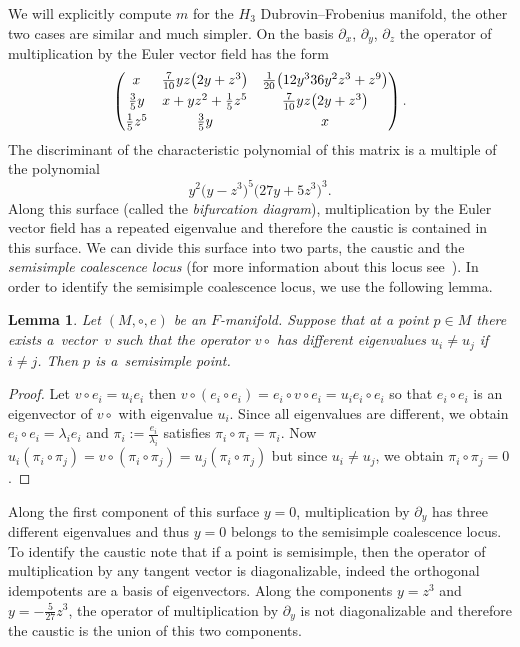 \documentclass[10pt,a4paper]{amsart}
\numberwithin{equation}{section}
\newtheorem{Lemma}[Theorem]{Lemma}
\begin{document}
We will explicitly compute $m$ for the $H_{3}$ Dubrovin--Frobenius manifold, the other two cases are similar and much simpler. On the basis $\partial_{x}$, $\partial_{y}$, $\partial_{z}$ the operator of multiplication by the Euler vector field has the form
\begin{equation*}
 \begin{pmatrix}
 x & \frac{7}{10}yz\bigl(2y +z^{3}\bigr) & \frac{1}{20}\bigl(12y^{3}36y^{2}z^{3}+z^{9}\bigr)\vspace{1mm}\\
 \frac{3}{5}y&x+yz^{2}+\frac{1}{5}z^{5}&\frac{7}{10}yz\bigl(2y+z^{3}\bigr)\vspace{1mm} \\
 \frac{1}{5}z^{5}&\frac{3}{5}y&x
 \end{pmatrix}.
\end{equation*}
The discriminant of the characteristic polynomial of this matrix is a multiple of the polynomial
\begin{equation*}
 y^{2}\bigl(y-z^{3}\bigr)^{5}\bigl(27y+5z^{3}\bigr)^{3}.
\end{equation*}
Along this surface (called the \emph{bifurcation diagram}), multiplication by the Euler vector field has a repeated eigenvalue and therefore the caustic is contained in this surface. We can divide this surface into two parts, the caustic and the \emph{semisimple coalescence locus} (for more information about this locus see~\cite{MR4094756}). In order to identify the semisimple coalescence locus, we use the following lemma.
\begin{Lemma}
 Let $(M,\circ,e)$ be an $F$-manifold. Suppose that at a point $p\in M$ there exists a~vector~$v$ such that the operator $v\circ$ has different eigenvalues $u_{i}\neq u_{j}$ if $i\neq j$. Then $p$ is a~semisimple point.
\end{Lemma}
\begin{proof}
 Let $v\circ e_{i}=u_{i}e_{i}$ then $v\circ(e_{i}\circ e_{i})=e_{i}\circ v\circ e_{i}=u_{i}e_{i}\circ e_{i}$ so that $e_{i}\circ e_{i}$ is an eigenvector of $v\circ$ with eigenvalue $u_{i}$. Since all eigenvalues are different, we obtain $e_{i}\circ e_{i}=\lambda_{i}e_{i}$ and $\pi_{i}:=\tfrac{e_{i}}{\lambda_{i}}$ satisfies $\pi_{i}\circ\pi_{i}=\pi_{i}$. Now $u_{i}(\pi_{i}\circ\pi_{j})=v\circ(\pi_{i}\circ\pi_{j})=u_{j}(\pi_{i}\circ\pi_{j})$ but since $u_{i}\neq u_{j}$, we obtain $\pi_{i}\circ\pi_{j}=0$.
\end{proof}

Along the first component of this surface $y=0$, multiplication by $\partial_{y}$ has three different eigenvalues and thus $y=0$ belongs to the semisimple coalescence locus. To identify the caustic note that if a point is semisimple, then the operator of multiplication by any tangent vector is diagonalizable, indeed the orthogonal idempotents are a basis of eigenvectors. Along the components $y=z^{3}$ and $y=-\tfrac{5}{27}z^{3}$, the operator of multiplication by $\partial_{y}$ is not diagonalizable and therefore the caustic is the union of this two components.
\end{document}
